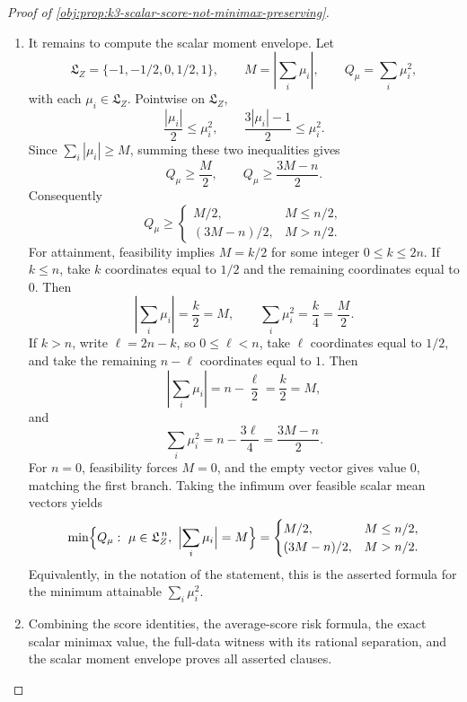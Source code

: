 \documentclass[11pt]{article}
\begin{document}
\begin{proof}[Proof of \cref{obj:prop:k3-scalar-score-not-minimax-preserving}]
\begin{enumerate}
\item
It remains to compute the scalar moment envelope. Let
\[
\mathfrak L_Z=\{-1,-1/2,0,1/2,1\},
\qquad
M=\left|\sum_i\mu_i\right|,
\qquad
Q_\mu=\sum_i\mu_i^2,
\]
with each \(\mu_i\in\mathfrak L_Z\). Pointwise on \(\mathfrak L_Z\),
\[
\frac{|\mu_i|}{2}\le \mu_i^2,
\qquad
\frac{3|\mu_i|-1}{2}\le \mu_i^2 .
\]
Since \(\sum_i|\mu_i|\ge M\), summing these two inequalities gives
\[
Q_\mu\ge \frac M2,
\qquad
Q_\mu\ge \frac{3M-n}{2}.
\]
Consequently
\[
Q_\mu\ge
\begin{cases}
M/2, & M\le n/2,\\
(3M-n)/2, & M>n/2.
\end{cases}
\]
For attainment, feasibility implies \(M=k/2\) for some integer \(0\le k\le2n\). If \(k\le n\), take \(k\) coordinates equal to \(1/2\) and the remaining coordinates equal to \(0\). Then
\[
\left|\sum_i\mu_i\right|=\frac k2=M,
\qquad
\sum_i\mu_i^2=\frac k4=\frac M2 .
\]
If \(k>n\), write \(\ell=2n-k\), so \(0\le\ell<n\), take \(\ell\) coordinates equal to \(1/2\), and take the remaining \(n-\ell\) coordinates equal to \(1\). Then
\[
\left|\sum_i\mu_i\right|
=n-\frac{\ell}{2}
=\frac k2=M,
\]
and
\[
\sum_i\mu_i^2
=n-\frac{3\ell}{4}
=\frac{3M-n}{2}.
\]
For \(n=0\), feasibility forces \(M=0\), and the empty vector gives value \(0\), matching the first branch. Taking the infimum over feasible scalar mean vectors yields
\[
\min\Bigl\{Q_\mu:\ \mu\in\mathfrak L_Z^{\,n},\ \Bigl|\sum_i\mu_i\Bigr|=M\Bigr\}
=
\begin{cases}
M/2, & M\le n/2,\\
(3M-n)/2, & M>n/2.
\end{cases}
\]
Equivalently, in the notation of the statement, this is the asserted formula for the minimum attainable \(\sum_i\mu_i^2\). %

\item
Combining the score identities, the average-score risk formula, the exact scalar minimax value, the full-data witness with its rational separation, and the scalar moment envelope proves all asserted clauses. %
\end{enumerate}
\end{proof}
\end{document}

